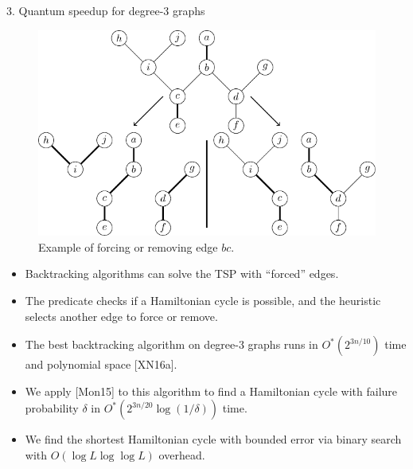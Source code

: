\documentclass[]{templates/poster}
\begin{document}
\begin{frame}{}
\begin{columns}[t]
  \begin{column}{0.422\linewidth}
  \begin{block}{\Large 3. Quantum speedup for degree-3 graphs}
  \begin{figure}
  \includegraphics[width=\linewidth]{reduction}
  \caption{Example of forcing or removing edge $bc$.}
  \end{figure}
  \begin{itemize}
  \item Backtracking algorithms can solve the TSP with ``forced'' edges.
  
  \item The predicate checks if a Hamiltonian cycle is possible, and the heuristic selects another edge to force or remove.

  \item The best backtracking algorithm on degree-3 graphs runs in $O^*(2^{3n/10})$ time and polynomial space [XN16a].
  
  \item We apply [Mon15] to this algorithm to find a Hamiltonian cycle with failure probability $\delta$ in $O^*(2^{3n/20}\log(1/\delta))$ time.
  
  \item We find the shortest Hamiltonian cycle with bounded error via binary search with $O(\log L\log\log L)$ overhead.
  \end{itemize}
  \end{block}
  \end{column}
\end{columns}
  
  \begin{columns}[t]
  \begin{column}{0.422\linewidth}


\end{column}
\end{columns}
\end{frame}
\end{document}
